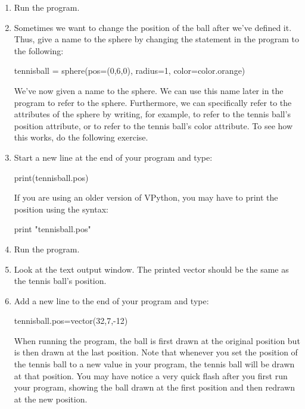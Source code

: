 \begin{enumerate}
	\item Run the program.

	\item Sometimes we want to change the position of the ball after we've defined it. Thus, give a name to the sphere by changing the  statement in the program to the following:

\begin{myvpython}
tennisball = sphere(pos=(0,6,0), radius=1, color=color.orange)
\end{myvpython}

We've now given a name to the sphere. We can use this name later in the program to refer to the sphere. Furthermore, we can specifically refer to the attributes of the sphere by writing, for example,  to refer to the tennis ball's position attribute, or  to refer to the tennis ball's color attribute. To see how this works, do the following exercise.

	\item Start a new line at the end of your program and type:

\begin{myvpython}
print(tennisball.pos)
\end{myvpython}

If you are using an older version of VPython, you may have to print the position using the syntax:

\begin{myvpython}
print "tennisball.pos"
\end{myvpython}


	\item Run the program.

	\item Look at the text output window. The printed vector should be the same as the tennis ball's position.

	\item Add a new line to the end of your program and type:
	
\begin{myvpython}
tennisball.pos=vector(32,7,-12)
\end{myvpython}
	
	When running the program, the ball is first drawn at the original position but is then drawn at the last position. Note that whenever you set the position of the tennis ball to a new value in your program, the tennis ball will be drawn at that position. You may have notice a very quick flash after you first run your program, showing the ball drawn at the first position and then redrawn at the new position.
	

\end{enumerate}
